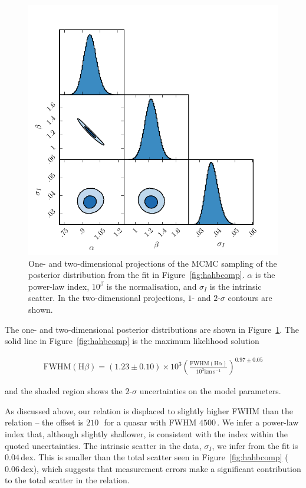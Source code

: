 \begin{figure}[h!]
    \centering
    \includegraphics[width=0.8\columnwidth]{figures/chapter03/ha_hb_mcmc_parameters.pdf} 
    \caption[{Projections of the MCMC sampling of the posterior distribution from the fit in Figure~\ref{fig:hahbcomp}.}]{One- and two-dimensional projections of the MCMC sampling of the posterior distribution from the fit in Figure~\ref{fig:hahbcomp}. $\alpha$ is the power-law index, $10^\beta$ is the normalisation, and $\sigma_I$ is the intrinsic scatter. In the two-dimensional projections, $1$- and $2$-$\sigma$ contours are shown.} 
    \label{fig:ha_hb_mcmc_samples}
\end{figure}

The one- and two-dimensional posterior distributions are shown in Figure~\ref{fig:ha_hb_mcmc_samples}. 
The solid line in Figure~\ref{fig:hahbcomp} is the maximum likelihood solution

\begingroup\makeatletter{}\check@mathfonts
\begin{eqnarray}
  \label{eq:ha2hb}
  \text{FWHM}(\text{H}\beta) = \left( 1.23 \pm 0.10 \right) \times 10^3 \left( \frac{\text{FWHM}(\text{H}\alpha)}{10^3 \text{km}\,\text{s}^{-1}} \right)^{0.97 \pm 0.05}
\end{eqnarray}
\endgroup

\noindent and the shaded region shows the $2$-$\sigma$ uncertainties on the model parameters.

As discussed above, our relation is displaced to slightly higher \hb FWHM than the \citet{greene05b} relation -- the offset is $210$\,\kms\, for a quasar with \ha FWHM $4500$\,\kms.  
We infer a power-law index that, although slightly shallower, is consistent with the \citet{greene05b} index within the quoted uncertainties. 
The intrinsic scatter in the data, $\sigma_I$, we infer from  the fit is $0.04$\,dex. 
This is smaller than the total scatter seen in Figure~\ref{fig:hahbcomp} ($0.06$\,dex), which suggests that measurement errors make a significant contribution to the total scatter in the relation. 

